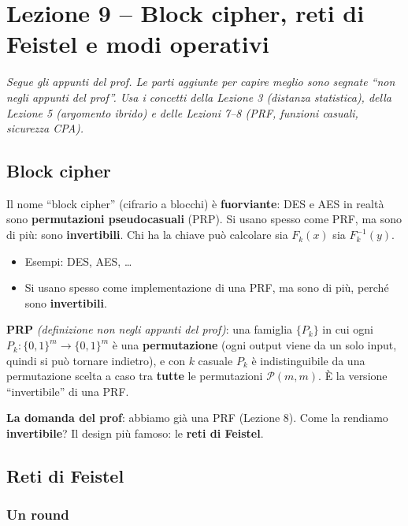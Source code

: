 \chapter{Lezione 9 -- Block cipher, reti di Feistel e modi operativi}

\emph{Segue gli appunti del prof. Le parti aggiunte per capire meglio sono segnate ``non negli appunti del prof''. Usa i concetti della Lezione 3 (distanza statistica), della Lezione 5 (argomento ibrido) e delle Lezioni 7--8 (PRF, funzioni casuali, sicurezza CPA).}

\section{Block cipher}

\begin{inbreve}
Il nome ``block cipher'' (cifrario a blocchi) è \textbf{fuorviante}: DES e AES in realtà sono \textbf{permutazioni pseudocasuali} (PRP). Si usano spesso come PRF, ma sono di più: sono \textbf{invertibili}. Chi ha la chiave può calcolare sia \(F_k(x)\) sia \(F_k^{-1}(y)\).
\end{inbreve}

\begin{itemize}
  \item Esempi: DES, AES, \dots
  \item Si usano spesso come implementazione di una PRF, ma sono di più, perché sono \textbf{invertibili}.
\end{itemize}

\begin{nota}
\textbf{PRP} \emph{(definizione non negli appunti del prof)}: una famiglia \(\{P_k\}\) in cui ogni \(P_k : \{0,1\}^{m} \to \{0,1\}^{m}\) è una \textbf{permutazione} (ogni output viene da un solo input, quindi si può tornare indietro), e con \(k\) casuale \(P_k\) è indistinguibile da una permutazione scelta a caso tra \textbf{tutte} le permutazioni \(\mathcal{P}(m, m)\). È la versione ``invertibile'' di una PRF.
\end{nota}

\textbf{La domanda del prof}: abbiamo già una PRF (Lezione 8). Come la rendiamo \textbf{invertibile}? Il design più famoso: le \textbf{reti di Feistel}.

\section{Reti di Feistel}

\subsection{Un round}

